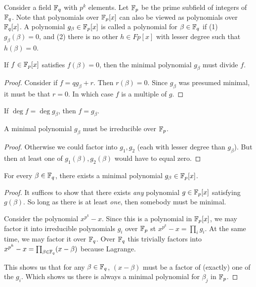 \begin{definition}
  Consider a field $\mathbb{F}_q$ with $p^k$ elements. Let $\mathbb{F}_p$ be the prime
  subfield of integers of $\mathbb{F}_q$. Note that polynomials over $\mathbb{F}_p[x]$ can
  also be viewed as polynomials over $\mathbb{F}_q[x]$. A polynomial $g_\beta \in
  \mathbb{F}_p[x]$ is called a  polynomial for $\beta \in \mathbb{F}_q$ if
  (1) $g_\beta(\beta) = 0$, and (2) there is no other $h \in Fp[x]$ with
  lesser degree such that $h(\beta) = 0$.
\end{definition}

\begin{proposition}
  If $f \in \mathbb{F}_p[x]$ satisfies $f(\beta) = 0$, then the minimal
  polynomial $g_\beta$ must divide $f$.
\end{proposition}

\begin{proof}
  Consider if $f = qg_\beta + r$. Then $r(\beta) = 0$. Since $g_\beta$
  was presumed minimal, it must be that $r = 0$. In which case $f$ is a
  multiple of $g$.
\end{proof}

\begin{corollary}
  If $\deg f = \deg g_\beta$, then $f = g_\beta$.
\end{corollary}

\begin{proposition}
  A minimal polynomial $g_\beta$ must be irreducible over $\mathbb{F}_p$.
\end{proposition}

\begin{proof}
  Otherwise we could factor into $g_1, g_2$ (each with lesser degree
  than $g_\beta$). But then at least one of $g_1(\beta), g_2(\beta)$
  would have to equal zero.
\end{proof}

\begin{proposition}
  For every $\beta \in \mathbb{F}_q$, there exists a minimal polynomial $g_\beta
  \in \mathbb{F}_p[x]$.
\end{proposition}

\begin{proof}
  It suffices to show that there exists \emph{any} polynomial $g \in
  \mathbb{F}_p[x]$ satisfying $g(\beta)$. So long as there is at least
  \emph{one}, then somebody must be minimal.

  Consider the polynomial $x^{p^k} - x$. Since this is a polynomial in
  $\mathbb{F}_p[x]$, we may factor it into irreducible polynomials $g_i$ over
  $\mathbb{F}_p$ st $x^{p^k} - x = \prod_i g_i$. At the same time, we may factor
  it over $\mathbb{F}_q$. Over $\mathbb{F}_q$ this trivially factors into $x^{p^k} - x =
  \prod_{\beta\in\mathbb{F}_q} (x - \beta)$ because Lagrange.

  This shows us that for any $\beta\in\mathbb{F}_q$, $(x - \beta)$ must be a
  factor of (exactly) one of the $g_i$. Which shows us there is always a
  minimal polynomial for $\beta_j$ in $\mathbb{F}_p$.
\end{proof}

